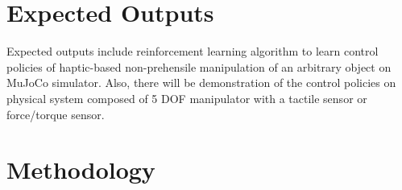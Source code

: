 \documentclass{article}
\begin{document}
%
%

%

\section{Expected Outputs}

Expected outputs include reinforcement learning algorithm to learn control policies of haptic-based non-prehensile manipulation of an arbitrary object on MuJoCo simulator. Also, there will be demonstration of the control policies on physical system composed of 5 DOF manipulator with a tactile sensor or force/torque sensor.

\section{Methodology}
\end{document}
